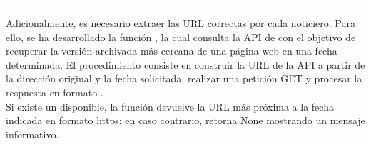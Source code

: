 \documentclass[letterpaper,10pt,spanish]{sphinxmanual}
\begin{document}
\begin{sphinxVerbatim}[commandchars=\\\{\},numbers=left,firstnumber=1,stepnumber=1]
               
              
\end{sphinxVerbatim}


\bigskip\hrule\bigskip


\sphinxAtStartPar
Adicionalmente, es necesario extraer las URL correctas por cada noticiero. Para ello, se ha desarrollado la función , la cual consulta la API de  con el objetivo de recuperar la versión archivada más cercana de una página web en una fecha determinada. El procedimiento consiste en construir la URL de la API a partir de la dirección original y la fecha solicitada, realizar una petición GET y procesar la respuesta en formato .\\
Si existe un  disponible, la función devuelve la URL más próxima a la fecha indicada en formato https; en caso contrario, retorna None mostrando un mensaje informativo.
\end{document}
